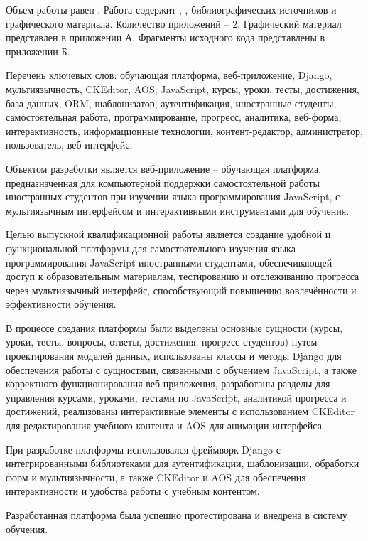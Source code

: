 
Объем работы равен . Работа содержит , ,  библиографических источников и  графического материала. Количество приложений – 2. Графический материал представлен в приложении А. Фрагменты исходного кода представлены в приложении Б.

Перечень ключевых слов: обучающая платформа, веб-приложение, Django, мультиязычность, CKEditor, AOS, JavaScript, курсы, уроки, тесты, достижения, база данных, ORM, шаблонизатор, аутентификация, иностранные студенты, самостоятельная работа, программирование, прогресс, аналитика, веб-форма, интерактивность, информационные технологии, контент-редактор, администратор, пользователь, веб-интерфейс.

Объектом разработки является веб-приложение -- обучающая платформа, предназначенная для компьютерной поддержки самостоятельной работы иностранных студентов при изучении языка программирования JavaScript, с мультиязычным интерфейсом и интерактивными инструментами для обучения.

Целью выпускной квалификационной работы является создание удобной и функциональной платформы для самостоятельного изучения языка программирования JavaScript иностранными студентами, обеспечивающей доступ к образовательным материалам, тестированию и отслеживанию прогресса через мультиязычный интерфейс, способствующий повышению вовлечённости и эффективности обучения.

В процессе создания платформы были выделены основные сущности (курсы, уроки, тесты, вопросы, ответы, достижения, прогресс студентов) путем проектирования моделей данных, использованы классы и методы Django для обеспечения работы с сущностями, связанными с обучением JavaScript, а также корректного функционирования веб-приложения, разработаны разделы для управления курсами, уроками, тестами по JavaScript, аналитикой прогресса и достижений, реализованы интерактивные элементы с использованием CKEditor для редактирования учебного контента и AOS для анимации интерфейса.

При разработке платформы использовался фреймворк Django с интегрированными библиотеками для аутентификации, шаблонизации, обработки форм и мультиязычности, а также CKEditor и AOS для обеспечения интерактивности и удобства работы с учебным контентом.

Разработанная платформа была успешно протестирована и внедрена в систему обучения.

